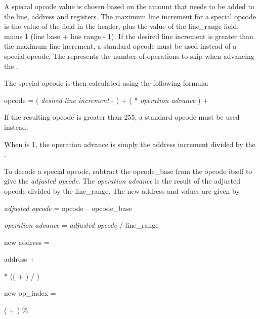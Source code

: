 A special opcode value is chosen based on the amount that needs
to be added to the line, address and  registers.
The
maximum line increment for a special opcode is the value
of the 
field in the header, plus the value of
the line\_range field, minus 1 (line base + 
line range - 1). 
If the desired line increment is greater than the maximum
line increment, a standard opcode must be used instead of a
special opcode. The  represents the number
of operations to skip when advancing the .

The special opcode is then calculated using the following formula:

  opcode = ( \textit{desired line increment} - ) +
( * \textit{operation advance} ) + 

If the resulting opcode is greater than 255, a standard opcode
must be used instead.

When  is 1, the operation
advance is simply the address increment divided by the
.

To decode a special opcode, subtract the opcode\_base from
the opcode itself to give the \textit{adjusted opcode}. 
The \textit{operation advance} 
is the result of the adjusted opcode divided by the
line\_range. The new address and  values
are given by
\begin{myindentpara}{1cm}

\textit{adjusted opcode} = opcode – opcode\_base

\textit{operation advance} = \textit{adjusted opcode} / line\_range

\begin{myindentpara}{1cm}
new address =

address +

 *
(( + ) / 
)
\end{myindentpara}
new op\_index =

\begin{myindentpara}{1cm}
( + ) \% 
\end{myindentpara}

\end{myindentpara}

